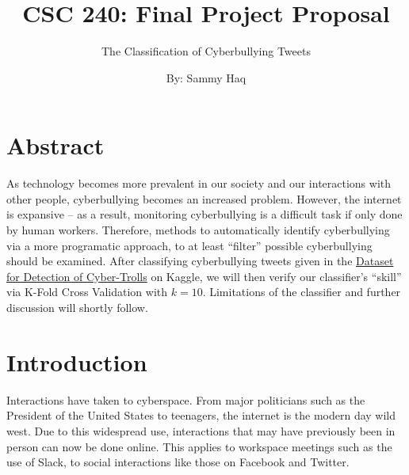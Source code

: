 \documentclass[12pt, letterpaper]{article}
\begin{document}


\title{CSC 240: Final Project Proposal}
\author{The Classification of Cyberbullying Tweets}
\date{By: Sammy Haq}

\maketitle
\newpage
%


%


%

\section*{Abstract}
As technology becomes more prevalent in our society and our interactions with
other people, cyberbullying becomes an increased problem. However, the internet
is expansive -- as a result, monitoring cyberbullying is a difficult task if
only done by human workers. Therefore, methods to automatically identify
cyberbullying via a more programatic approach, to at least ``filter'' possible
cyberbullying should be examined. After classifying cyberbullying tweets given in
the \href{https://www.kaggle.com/dataturks/dataset-for-detection-of-cybertrolls}
{Dataset for Detection of Cyber-Trolls} on Kaggle, we will then verify our
classifier's ``skill'' via K-Fold Cross Validation with $k = 10$. Limitations of
the classifier and further discussion will shortly follow.


\section{Introduction} %
Interactions have taken to cyberspace. From major politicians such as the
President of the United States to teenagers, the internet is the modern day
wild west. Due to this widespread use, interactions that may have previously
been in person can now be done online. This applies to workspace meetings such
as the use of Slack, to social interactions like those on Facebook and Twitter.
\end{document}
